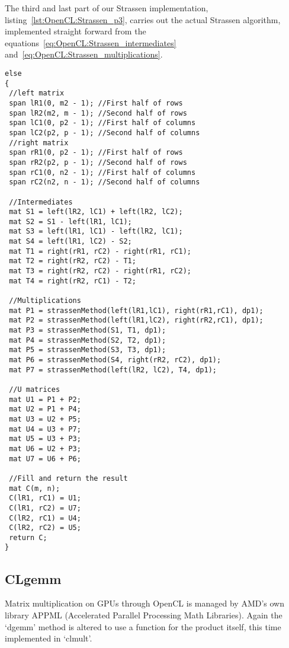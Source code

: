The third and last part of our Strassen implementation, listing~\ref{lst:OpenCL:Strassen_p3}, carries out the actual Strassen algorithm, implemented straight forward from the equations~\eqref{eq:OpenCL:Strassen_intermediates} and~\eqref{eq:OpenCL:Strassen_multiplications}.
\begin{lstlisting}[float,label={lst:OpenCL:Strassen_p3},caption={Strassen p3. Continuation of listing~\ref{lst:OpenCL:Strassen_p2}.},name={strassen_complete}]
else
{
 //left matrix
 span lR1(0, m2 - 1); //First half of rows
 span lR2(m2, m - 1); //Second half of rows
 span lC1(0, p2 - 1); //First half of columns
 span lC2(p2, p - 1); //Second half of columns
 //right matrix
 span rR1(0, p2 - 1); //First half of rows
 span rR2(p2, p - 1); //Second half of rows
 span rC1(0, n2 - 1); //First half of columns
 span rC2(n2, n - 1); //Second half of columns

 //Intermediates
 mat S1 = left(lR2, lC1) + left(lR2, lC2);
 mat S2 = S1 - left(lR1, lC1);
 mat S3 = left(lR1, lC1) - left(lR2, lC1);
 mat S4 = left(lR1, lC2) - S2;
 mat T1 = right(rR1, rC2) - right(rR1, rC1);
 mat T2 = right(rR2, rC2) - T1;
 mat T3 = right(rR2, rC2) - right(rR1, rC2);
 mat T4 = right(rR2, rC1) - T2;

 //Multiplications
 mat P1 = strassenMethod(left(lR1,lC1), right(rR1,rC1), dp1);
 mat P2 = strassenMethod(left(lR1,lC2), right(rR2,rC1), dp1);
 mat P3 = strassenMethod(S1, T1, dp1);
 mat P4 = strassenMethod(S2, T2, dp1);
 mat P5 = strassenMethod(S3, T3, dp1);
 mat P6 = strassenMethod(S4, right(rR2, rC2), dp1);
 mat P7 = strassenMethod(left(lR2, lC2), T4, dp1);

 //U matrices
 mat U1 = P1 + P2;
 mat U2 = P1 + P4;
 mat U3 = U2 + P5;
 mat U4 = U3 + P7;
 mat U5 = U3 + P3;
 mat U6 = U2 + P3;
 mat U7 = U6 + P6;

 //Fill and return the result
 mat C(m, n);
 C(lR1, rC1) = U1;
 C(lR1, rC2) = U7;
 C(lR2, rC1) = U4;
 C(lR2, rC2) = U5;
 return C;
}
\end{lstlisting}







\subsection{CLgemm}
Matrix multiplication on GPUs through OpenCL is managed by AMD's own library APPML (Accelerated Parallel Processing Math Libraries).
Again the `dgemm' method is altered to use a function for the product itself, this time implemented in `clmult'.

